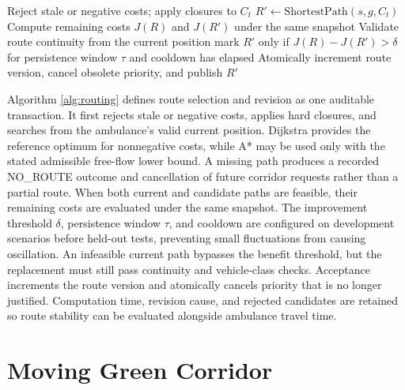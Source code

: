 \begin{algorithm}[H]
\caption{Congestion-aware route selection and stable rerouting}
\label{alg:routing}
Reject stale or negative costs; apply closures to $C_t$\;
$R'\leftarrow \mathrm{ShortestPath}(s,g,C_t)$\;
Compute remaining costs $J(R)$ and $J(R')$ under the same snapshot\;
Validate route continuity from the current position\;
{mark $R'$ only if $J(R)-J(R')>\delta$ for persistence window $\tau$ and cooldown has elapsed\;}
Atomically increment route version, cancel obsolete priority, and publish $R'$\;
\end{algorithm}

Algorithm \ref{alg:routing} defines route selection and revision as one auditable transaction. It first rejects stale or negative costs, applies hard closures, and searches from the ambulance's valid current position. Dijkstra provides the reference optimum for nonnegative costs, while A* may be used only with the stated admissible free-flow lower bound. A missing path produces a recorded NO\_ROUTE outcome and cancellation of future corridor requests rather than a partial route. When both current and candidate paths are feasible, their remaining costs are evaluated under the same snapshot. The improvement threshold $\delta$, persistence window $\tau$, and cooldown are configured on development scenarios before held-out tests, preventing small fluctuations from causing oscillation. An infeasible current path bypasses the benefit threshold, but the replacement must still pass continuity and vehicle-class checks. Acceptance increments the route version and atomically cancels priority that is no longer justified. Computation time, revision cause, and rejected candidates are retained so route stability can be evaluated alongside ambulance travel time.

\section{Moving Green Corridor}

